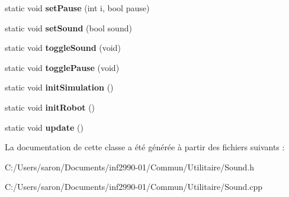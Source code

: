 \begin{DoxyCompactItemize}
\item 
\hypertarget{class_sound_a661b95e1828f25208e896de204e05970}{static void {\bfseries set\-Pause} (int i, bool pause)}\label{class_sound_a661b95e1828f25208e896de204e05970}

\item 
\hypertarget{class_sound_a4290641b32b6fa9cf9ee1bdb3c5d1170}{static void {\bfseries set\-Sound} (bool sound)}\label{class_sound_a4290641b32b6fa9cf9ee1bdb3c5d1170}

\item 
\hypertarget{class_sound_a09987dcbd09acf38c9be00dface94392}{static void {\bfseries toggle\-Sound} (void)}\label{class_sound_a09987dcbd09acf38c9be00dface94392}

\item 
\hypertarget{class_sound_a7faeeeb29c7ddd343bd1d6c06dda7981}{static void {\bfseries toggle\-Pause} (void)}\label{class_sound_a7faeeeb29c7ddd343bd1d6c06dda7981}

\item 
\hypertarget{class_sound_a6d1fa9aa92498ab1c5df54f95a65e3c0}{static void {\bfseries init\-Simulation} ()}\label{class_sound_a6d1fa9aa92498ab1c5df54f95a65e3c0}

\item 
\hypertarget{class_sound_a1f6e93ee29836e9a6521fd51c452ca51}{static void {\bfseries init\-Robot} ()}\label{class_sound_a1f6e93ee29836e9a6521fd51c452ca51}

\item 
\hypertarget{class_sound_a1363950fc24a88df0c358f453843b80c}{static void {\bfseries update} ()}\label{class_sound_a1363950fc24a88df0c358f453843b80c}

\end{DoxyCompactItemize}


La documentation de cette classe a été générée à partir des fichiers suivants \-:\begin{DoxyCompactItemize}
\item 
C\-:/\-Users/saron/\-Documents/inf2990-\/01/\-Commun/\-Utilitaire/Sound.\-h\item 
C\-:/\-Users/saron/\-Documents/inf2990-\/01/\-Commun/\-Utilitaire/Sound.\-cpp\end{DoxyCompactItemize}
